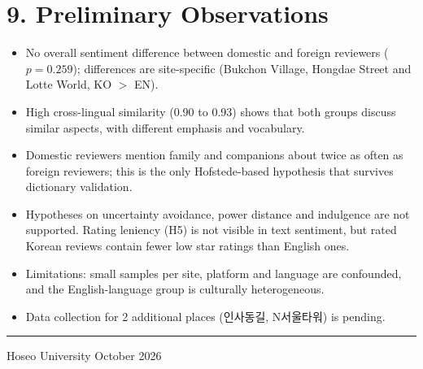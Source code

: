 \documentclass[11pt,a4paper]{article}
\begin{document}
\section*{9. Preliminary Observations}

\begin{itemize}\itemsep3pt
  \item No overall sentiment difference between domestic and foreign reviewers
        ($p = 0.259$); differences are site-specific (Bukchon Village,
        Hongdae Street and Lotte World, KO $>$ EN).
  \item High cross-lingual similarity (0.90 to 0.93) shows that both groups
        discuss similar aspects, with different emphasis and vocabulary.
  \item Domestic reviewers mention family and companions about twice as often
        as foreign reviewers; this is the only Hofstede-based hypothesis that
        survives dictionary validation.
  \item Hypotheses on uncertainty avoidance, power distance and indulgence are
        not supported. Rating leniency (H5) is not visible in text sentiment, but
        rated Korean reviews contain fewer low star ratings than English ones.
  \item Limitations: small samples per site, platform and language are
        confounded, and the English-language group is culturally heterogeneous.
  \item Data collection for 2 additional places (인사동길, N서울타워) is pending.
\end{itemize}

\vspace{8pt}
\noindent\rule{\linewidth}{0.4pt}
{\small Hoseo University \hfill October 2026}
\end{document}

